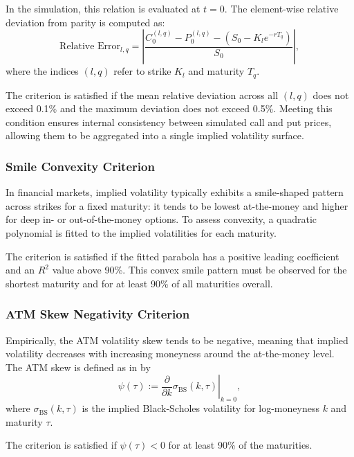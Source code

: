 In the simulation, this relation is evaluated at $t = 0$. The element-wise relative deviation from parity is computed as:
\begin{equation} \label{eq:PutCallViolation}
    \text{Relative Error}_{l,q} = \left| \frac{C_0^{(l,q)} - P_0^{(l,q)} - \left( S_0 - K_l e^{-r T_q} \right)}{S_0} \right|,
\end{equation}
where the indices $(l, q)$ refer to strike $K_l$ and maturity $T_q$.

The criterion is satisfied if the mean relative deviation across all $(l, q)$ does not exceed 0.1\% and the maximum deviation does not exceed 0.5\%. Meeting this condition ensures internal consistency between simulated call and put prices, allowing them to be aggregated into a single implied volatility surface.

\subsubsection*{Smile Convexity Criterion}
In financial markets, implied volatility typically exhibits a smile-shaped pattern across strikes for a fixed maturity: it tends to be lowest at-the-money and higher for deep in- or out-of-the-money options. To assess convexity, a quadratic polynomial is fitted to the implied volatilities for each maturity.

The criterion is satisfied if the fitted parabola has a positive leading coefficient and an $R^2$ value above 90\%. This convex smile pattern must be observed for the shortest maturity and for at least 90\% of all maturities overall.

\subsubsection*{ATM Skew Negativity Criterion}
Empirically, the ATM volatility skew tends to be negative, meaning that implied volatility decreases with increasing moneyness around the at-the-money level. The ATM skew is defined as in \citet{BayerFrizGatheral2016} by
\begin{equation} \label{eq:ATMSkew}
    \psi(\tau) := \left. \frac{\partial}{\partial k} \sigma_{\text{BS}}(k, \tau) \right|_{k = 0},
\end{equation}
where $\sigma_{\text{BS}}(k, \tau)$ is the implied Black-Scholes volatility for log-moneyness $k$ and maturity $\tau$.

The criterion is satisfied if $\psi(\tau) < 0$ for at least 90\% of the maturities.

